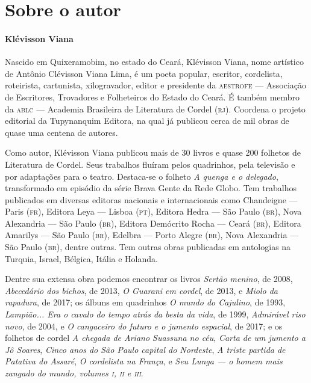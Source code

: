 \documentclass[11pt]{extarticle}
\begin{document}
\reversemarginpar
\marginparwidth=5cm


\section{Sobre o autor}

\paragraph{Klévisson Viana}

Nascido em Quixeramobim, no estado do Ceará, Klévisson Viana, nome artístico de Antônio 
Clévisson Viana Lima, é um poeta popular, escritor, cordelista, roteirista, cartunista, 
xilogravador, editor e presidente da \textsc{aestrofe} --- Associação de Escritores, 
Trovadores e Folheteiros do Estado do Ceará. É também membro da \textsc{ablc} --- Academia 
Brasileira de Literatura de Cordel (\textsc{rj}). Coordena o projeto editorial da 
Tupynanquim Editora, na qual já publicou cerca de mil obras de quase uma centena de autores. 

Como autor, Klévisson Viana publicou mais de 30 livros e quase 200 folhetos de 
Literatura de Cordel. Seus trabalhos fluíram pelos quadrinhos, pela televisão e por 
adaptações para o teatro. Destaca-se o folheto \textit{A quenga e o delegado}, transformado 
em episódio da série Brava Gente da Rede Globo. Tem trabalhos publicados em diversas 
editoras nacionais e internacionais como Chandeigne --- Paris (\textsc{fr}), Editora Leya 
--- Lisboa (\textsc{pt}), Editora Hedra --- São Paulo (\textsc{br}), Nova Alexandria --- 
São Paulo (\textsc{br}), Editora Demócrito Rocha --- Ceará (\textsc{br}), 
Editora Amarilys --- São Paulo (\textsc{br}), Edelbra --- Porto Alegre (\textsc{br}), 
Nova Alexandria --- São Paulo (\textsc{br}), dentre outras. Tem outras obras publicadas 
em antologias na Turquia, Israel, Bélgica, Itália e Holanda. 



Dentre sua extensa obra podemos encontrar os livros \textit{Sertão menino}, de 2008, 
\textit{Abecedário dos bichos}, de 2013, \textit{O Guarani em cordel}, de 2013, e 
\textit{Miolo da rapadura}, de 2017; os álbuns em quadrinhos \textit{O mundo do Cajulino}, 
de 1993, \textit{Lampião... Era o cavalo do tempo atrás da besta da vida}, de 1999, 
\textit{Admirável riso novo}, de 2004, e \textit{O cangaceiro do futuro e o jumento espacial}, 
de 2017; e os folhetos de cordel \textit{A chegada de Ariano Suassuna no céu}, 
\textit{Carta de um jumento a Jô Soares}, \textit{Cinco anos do São Paulo capital do Nordeste}, 
\textit{A triste partida de Patativa do Assaré}, \textit{O cordelista na França}, e 
\textit{Seu Lunga --- o homem mais zangado do mundo, volumes \textsc{i}, \textsc{ii} e \textsc{iii}}.
\end{document}
